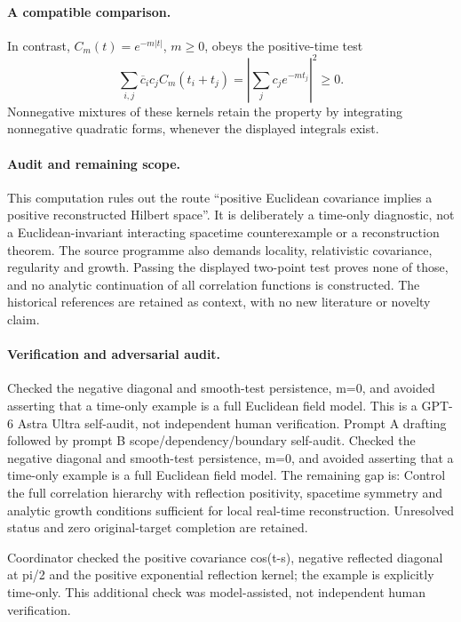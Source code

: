 \documentclass[11pt]{article}
\begin{document}
\paragraph{A compatible comparison.} In contrast, \(C_m(t)=e^{-m|t|}\), \(m\ge0\), obeys the positive-time test
\[
 \sum_{i,j}\overline c_i c_j C_m(t_i+t_j)
 =\left|\sum_j c_je^{-mt_j}\right|^2\ge0.
\]
Nonnegative mixtures of these kernels retain the property by integrating nonnegative quadratic forms, whenever the displayed integrals exist.
\paragraph{Audit and remaining scope.} This computation rules out the route ``positive Euclidean covariance implies a positive reconstructed Hilbert space''. It is deliberately a time-only diagnostic, not a Euclidean-invariant interacting spacetime counterexample or a reconstruction theorem. The source programme also demands locality, relativistic covariance, regularity and growth. Passing the displayed two-point test proves none of those, and no analytic continuation of all correlation functions is constructed. The historical references are retained as context, with no new literature or novelty claim.

\paragraph{Verification and adversarial audit.}
Checked the negative diagonal and smooth-test persistence, m=0, and avoided asserting that a time-only example is a full Euclidean field model. This is a GPT-6 Astra Ultra self-audit, not independent human verification. Prompt A drafting followed by prompt B scope/dependency/boundary self-audit. Checked the negative diagonal and smooth-test persistence, m=0, and avoided asserting that a time-only example is a full Euclidean field model. The remaining gap is: Control the full correlation hierarchy with reflection positivity, spacetime symmetry and analytic growth conditions sufficient for local real-time reconstruction. Unresolved status and zero original-target completion are retained.

Coordinator checked the positive covariance cos(t-s), negative reflected diagonal at pi/2 and the positive exponential reflection kernel; the example is explicitly time-only. This additional check was model-assisted, not independent human verification.
\end{document}
